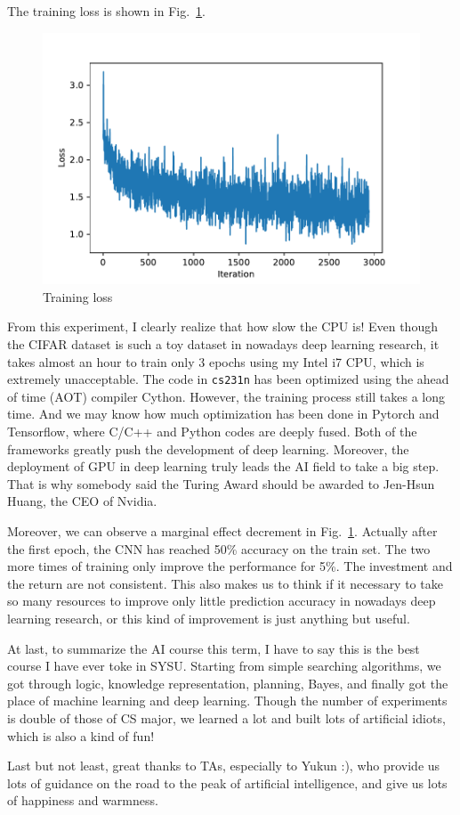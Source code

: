 \documentclass[a4paper, 11pt]{article}
\begin{document}
The training loss is shown in Fig.~\ref{fig:loss}.
\begin{figure}[H]
\centering
\includegraphics[width=0.5\linewidth]{fig/loss.pdf}
\caption{Training loss}
\label{fig:loss}
\end{figure}

From this experiment, I clearly realize that how slow the CPU is!
Even though the CIFAR dataset is such a toy dataset in nowadays deep learning research, it takes almost an hour to train only 3 epochs using my Intel i7 CPU, which is extremely unacceptable.
The code in \verb'cs231n' has been optimized using the ahead of time (AOT) compiler Cython.
However, the training process still takes a long time.
And we may know how much optimization has been done in Pytorch and Tensorflow, where C/C++ and Python codes are deeply fused.
Both of the frameworks greatly push the development of deep learning.
Moreover, the deployment of GPU in deep learning truly leads the AI field to take a big step.
That is why somebody said the Turing Award should be awarded to Jen-Hsun Huang, the CEO of Nvidia.

Moreover, we can observe a marginal effect decrement in Fig.~\ref{fig:loss}.
Actually after the first epoch, the CNN has reached 50\% accuracy on the train set.
The two more times of training only improve the performance for 5\%.
The investment and the return are not consistent.
This also makes us to think if it necessary to take so many resources to improve only little prediction accuracy in nowadays deep learning research, or this kind of improvement is just anything but useful.

At last, to summarize the AI course this term, I have to say this is the best course I have ever toke in SYSU.
Starting from simple searching algorithms, we got through logic, knowledge representation, planning, Bayes, and finally got the place of machine learning and deep learning.
Though the number of experiments is double of those of CS major, we learned a lot and built lots of artificial idiots, which is also a kind of fun!

Last but not least, great thanks to TAs, especially to Yukun :), who provide us lots of guidance on the road to the peak of artificial intelligence, and give us lots of happiness and warmness.
\end{document}
